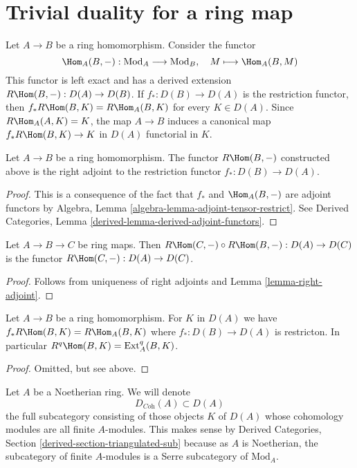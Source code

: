 \section{Trivial duality for a ring map}
\label{section-trivial}

\noindent
Let $A \to B$ be a ring homomorphism. Consider the functor
$$
\Hom_A(B, -) : \text{Mod}_A \longrightarrow \text{Mod}_B,\quad
M \longmapsto \Hom_A(B, M)
$$
This functor is left exact and has a derived extension
$R\Hom(B, -) : D(A) \to D(B)$. If $f_* : D(B) \to D(A)$ is the restriction
functor, then $f_*R\Hom(B, K) = R\Hom_A(B, K)$ for every $K \in D(A)$.
Since $R\Hom_A(A, K) = K$, the map $A \to B$ induces a canonical map
$f_*R\Hom(B, K) \to K$ in $D(A)$ functorial in $K$.

\begin{lemma}
\label{lemma-right-adjoint}
Let $A \to B$ be a ring homomorphism. The functor $R\Hom(B, -)$
constructed above is the right adjoint to the restriction functor
$f_* : D(B) \to D(A)$.
\end{lemma}

\begin{proof}
This is a consequence of the fact that $f_*$ and $\Hom_A(B, -)$ are
adjoint functors by Algebra, Lemma \ref{algebra-lemma-adjoint-tensor-restrict}.
See Derived Categories, Lemma \ref{derived-lemma-derived-adjoint-functors}.
\end{proof}

\begin{lemma}
\label{lemma-composition-right-adjoints}
Let $A \to B \to C$ be ring maps. Then
$R\Hom(C, -) \circ R\Hom(B, -) : D(A) \to D(C)$
is the functor $R\Hom(C, -) : D(A) \to D(C)$.
\end{lemma}

\begin{proof}
Follows from uniqueness of right adjoints and Lemma \ref{lemma-right-adjoint}.
\end{proof}

\begin{lemma}
\label{lemma-RHom-ext}
Let $A \to B$ be a ring homomorphism. For $K$ in $D(A)$ we have
$f_*R\Hom(B, K) = R\Hom_A(B, K)$ where $f_* : D(B) \to D(A)$ is
restricton. In particular $R^q\Hom(B, K) = \text{Ext}_A^q(B, K)$.
\end{lemma}

\begin{proof}
Omitted, but see above.
\end{proof}

\noindent
Let $A$ be a Noetherian ring. We will denote
$$
D_{\textit{Coh}}(A) \subset D(A)
$$
the full subcategory consisting of those objects $K$ of $D(A)$
whose cohomology modules are all finite $A$-modules. This makes sense
by Derived Categories, Section \ref{derived-section-triangulated-sub}
because as $A$ is Noetherian, the subcategory of finite $A$-modules
is a Serre subcategory of $\text{Mod}_A$.

